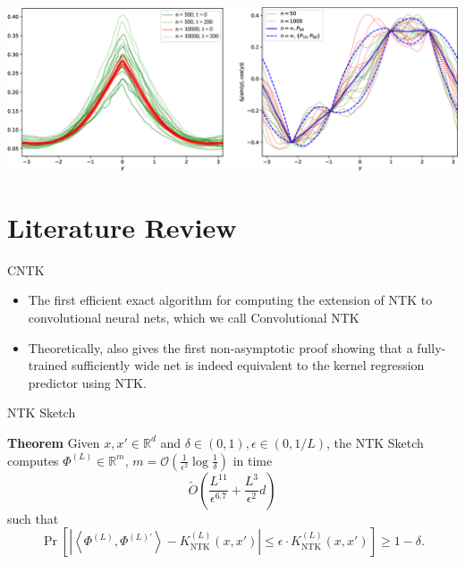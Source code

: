 \documentclass[serif, aspectratio=169]{beamer}
\begin{document}
 \begin{frame}
  \centering %
 \includegraphics[width=\textwidth]{pic/NTK_paper_exp.png} %
  \end{frame}
 
 
 
 
 
\section{Literature Review}

\begin{frame}{CNTK}
\begin{itemize}
	\item The first efficient exact algorithm for computing the extension of NTK to convolutional neural nets, which we call Convolutional NTK
	\item Theoretically, also
	gives the first non-asymptotic proof showing that a fully-trained sufficiently wide net is indeed equivalent to the kernel regression predictor using NTK.
\end{itemize}
\end{frame}

\begin{frame}{NTK Sketch}
	
	\textbf{Theorem} Given \( x, x' \in \mathbb{R}^d \) and \( \delta \in (0, 1), \epsilon \in (0, 1/L) \), the NTK Sketch computes \( \Phi^{(L)} \in \mathbb{R}^m \), \( m = \mathcal{O}\left(\frac{1}{\epsilon^2} \log \frac{1}{\delta}\right) \) in time
	\[
	\tilde{O}\left( \frac{L^{11}}{\epsilon^{6.7}} + \frac{L^3}{\epsilon^2} d \right)
	\]
	such that
	\[
	\Pr\left[ \left| \left\langle \Phi^{(L)}, \Phi^{(L)'} \right\rangle - K_{\text{NTK}}^{(L)}(x, x') \right| \leq \epsilon \cdot K_{\text{NTK}}^{(L)}(x, x') \right] \geq 1 - \delta.
	\]

\end{frame}
\end{document}
